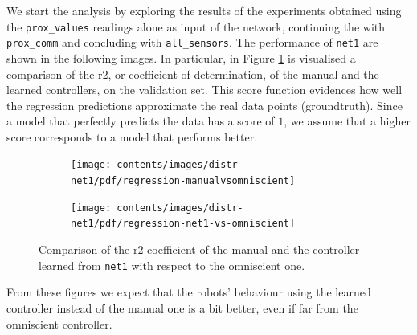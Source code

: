 We start the analysis by exploring the results of the experiments obtained 
using the \texttt{prox\_values} readings alone as input of the network, continuing 
the with \texttt{prox\_comm} and concluding with \texttt{all\_sensors}.
The performance of \texttt{net1} are shown in the following images. In particular,  
in Figure \ref{fig:net1r2} is visualised a comparison of the \gls{r2}, or coefficient 
of determination, of the manual and the learned controllers, on the validation set.
This score function evidences how well the regression predictions approximate 
the real data points (groundtruth). Since a model that perfectly predicts the data 
has a score of $1$, we assume that a higher score corresponds to a model that 
performs better.
\begin{figure}[!htb]
	\centering
	\begin{subfigure}[h]{0.49\textwidth}
		\centering
		\texttt{[image: contents/images/distr-net1/pdf/regression-manualvsomniscient]}%
	\end{subfigure}
	\hfill
	\begin{subfigure}[h]{0.49\textwidth}
		\centering
		\texttt{[image: contents/images/distr-net1/pdf/regression-net1-vs-omniscient]}
	\end{subfigure}
	\caption[Evaluation of the \gls{r2} coefficients of \texttt{net1} 
	.]{Comparison of 
	the \gls{r2} coefficient of the manual and the controller learned from 
	\texttt{net1} with respect to the omniscient one.}
	\label{fig:net1r2}
\end{figure}
From these figures we expect that the robots' behaviour using the learned 
controller instead of the manual one is a bit better, even if far from the omniscient 
controller.

